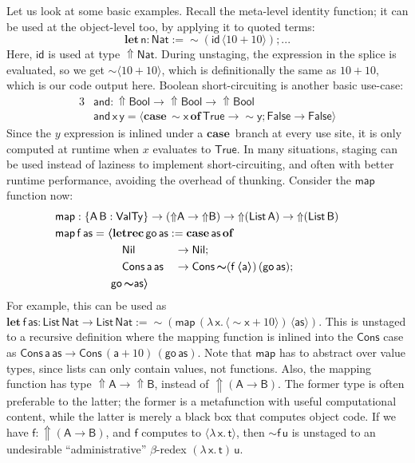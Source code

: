 \documentclass[acmsmall,screen,review,anonymous]{acmart}
\newcommand{\mit}[1]{{\mathsf{#1}}}
\newcommand{\msf}[1]{{\mathsf{#1}}}
\newcommand{\mbf}[1]{{\mathbf{#1}}}
\newcommand{\bs}[1]{\boldsymbol{#1}}
\newcommand{\ind}{\hspace{1em}}
\newcommand{\lam}{\lambda\,}
\newcommand{\letrec}{\mbf{letrec}\,}
\newcommand{\of}{\mbf{of}\,}
\newcommand{\go}{\mit{go}}
\newcommand{\letdef}{\mbf{let\,}}
\newcommand{\map}{\mit{map}}
\newcommand{\vas}{\mathsf{as}}
\newcommand{\vn}{\mathsf{n}}
\newcommand{\vA}{\mathsf{A}}
\newcommand{\vB}{\mathsf{B}}
\newcommand{\va}{\mathsf{a}}
\newcommand{\vx}{\mathsf{x}}
\newcommand{\vy}{\mathsf{y}}
\newcommand{\vf}{\mathsf{f}}
\newcommand{\vt}{\mathsf{t}}
\newcommand{\vu}{\mathsf{u}}
\newcommand{\List}{\msf{List}}
\newcommand{\Nil}{\msf{Nil}}
\newcommand{\Cons}{\msf{Cons}}
\newcommand{\Bool}{\msf{Bool}}
\newcommand{\case}{\mbf{case\,}}
\newcommand{\Lift}{{\Uparrow}}
\newcommand{\Up}{{\Uparrow}}
\newcommand{\spl}{{\bs{\sim}}}
\newcommand{\ql}{{\bs{\langle}}}
\newcommand{\qr}{{\bs{\rangle}}}
\newcommand{\VTy}{\msf{ValTy}}
\newcommand{\True}{\msf{True}}
\newcommand{\False}{\msf{False}}
\newcommand{\Nat}{\msf{Nat}}
\theoremstyle{remark}
\newcommand{\id}{\mit{id}}
\newcommand{\qt}[1]{\ql#1\qr}
\begin{document}
Let us look at some basic examples. Recall the meta-level identity function; it
can be used at the object-level too, by applying it to quoted terms:
  \[ \letdef \vn : \Nat := \spl(\id\,\ql 10 + 10 \qr); ... \]
Here, $\id$ is used at type $\Lift \Nat$. During unstaging, the expression in
the splice is evaluated, so we get $\spl\ql 10 + 10 \qr$, which is
definitionally the same as $10 + 10$, which is our code output here. Boolean
short-circuiting is another basic use-case:
\begin{alignat*}{3}
  &\mit{and} : \Up\Bool \to \Up\Bool \to \Up\Bool\\
  &\mit{and}\,\vx\,\vy = \ql\case \spl \vx\,\of \True \to \spl \vy; \False \to \False\qr
\end{alignat*}
Since the $y$ expression is inlined under a $\case$ branch at every use site, it
is only computed at runtime when $x$ evaluates to $\True$. In many situations,
staging can be used instead of laziness to implement short-circuiting, and often
with better runtime performance, avoiding the overhead of thunking. Consider the
$\map$ function now:
\begin{alignat*}{3}
  & \hspace{-5em}\mathrlap{\map : \{\vA\,\vB : \VTy\} \to (\Up \vA \to \Up \vB) \to \Up (\List\,\vA) \to \Up(\List\,\vB)}\\
  & \hspace{-5em}\mathrlap{\map\,\vf\,\vas = \ql\letrec \go\,\vas := \case \vas\,\of}\\
  & \hspace{-5em}\ind\ind\ind\ind\ind \ind\Nil             &&\to \Nil;\\
  & \hspace{-5em}\ind\ind\ind\ind\ind \ind\Cons\,\va\,\vas &&\to \Cons\,\spl(\vf\,\ql \va \qr)\,(\go\,\vas);\\
  & \hspace{-5em}\ind\ind\ind\ind\ind\go\,\spl\vas \qr
\end{alignat*}
For example, this can be used as $\letdef \vf\,\vas : \List\,\Nat \to
\List\,\Nat := \spl(\map\,(\lam \vx.\,\ql \spl \vx + 10 \qr)\,\qt{\vas}) $.
This is unstaged to a recursive definition where the mapping function is inlined
into the $\Cons$ case as $\Cons\,\va\,\vas \to \Cons\,(\va + 10)\,(\go\,\vas)$.
Note that $\map$ has to abstract over value types, since lists can only contain
values, not functions. Also, the mapping function has type $\Up \vA \to \Up
\vB$, instead of $\Up (\vA \to \vB)$. The former type is often preferable to the
latter; the former is a metafunction with useful computational content, while
the latter is merely a black box that computes object code. If we have $\vf :
\Up(\vA \to \vB)$, and $\vf$ computes to $\ql \lam \vx.\,\vt\qr$, then $\spl
\vf\,\vu$ is unstaged to an undesirable ``administrative'' $\beta$-redex $(\lam
\vx.\,\vt)\,\vu$.
\end{document}
